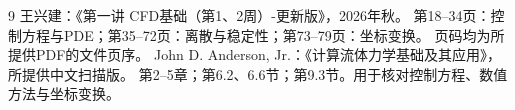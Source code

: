 \begin{thebibliography}{9}
 王兴建：《第一讲 CFD基础（第1、2周）-更新版》，2026年秋。
 第18--34页：控制方程与PDE；第35--72页：离散与稳定性；第73--79页：坐标变换。
 页码均为所提供PDF的文件页序。
 John D. Anderson, Jr.：《计算流体力学基础及其应用》，所提供中文扫描版。
 第2--5章；第6.2、6.6节；第9.3节。用于核对控制方程、数值方法与坐标变换。
\end{thebibliography}
